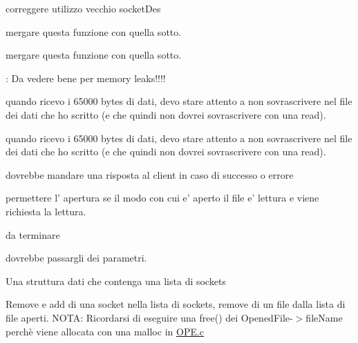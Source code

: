 
\begin{DoxyRefList}
\item[\label{todo__todo000007}%
\hypertarget{todo__todo000007}{}%
Globale \hyperlink{OPE_8c_af1f79690eec0a7727a519ba59a891762}{create\+Control\+Sock} (int port\+No, int socket\+Id)]correggere utilizzo vecchio socket\+Des  
\item[\label{todo__todo000003}%
\hypertarget{todo__todo000003}{}%
Globale \hyperlink{CommandsHandler_8h_a919c7f4b4bcb820f1d6566238178390e}{get\+Command\+I\+D} (char $\ast$)]mergare questa funzione con quella sotto.  
\item[\label{todo__todo000003}%
\hypertarget{todo__todo000003}{}%
Globale \hyperlink{CommandsHandler_8h_a919c7f4b4bcb820f1d6566238178390e}{get\+Command\+I\+D} (char $\ast$)]mergare questa funzione con quella sotto.  
\item[\label{todo__todo000006}%
\hypertarget{todo__todo000006}{}%
Globale \hyperlink{OPE_8c_a6eccb6ec6ec9c8375e70ab4088b511a5}{handle\+Open\+Command} (char $\ast$command, int socket)]\+: Da vedere bene per memory leaks!!!!  
\item[\label{todo__todo000002}%
\hypertarget{todo__todo000002}{}%
Globale \hyperlink{Client_2READ_8c_aa4b63039ca9686f5666ce6bbb33317d7}{mydfs\+\_\+read} (\hyperlink{structMyDFSId}{My\+D\+F\+S\+Id} $\ast$id, int pos, void $\ast$ptr, unsigned int size)]quando ricevo i 65000 bytes di dati, devo stare attento a non sovrascrivere nel file dei dati che ho scritto (e che quindi non dovrei sovrascrivere con una read).  
\item[\label{todo__todo000002}%
\hypertarget{todo__todo000002}{}%
Globale \hyperlink{Client_2READ_8c_aa4b63039ca9686f5666ce6bbb33317d7}{mydfs\+\_\+read} (\hyperlink{structMyDFSId}{My\+D\+F\+S\+Id} $\ast$id, int pos, void $\ast$ptr, unsigned int size)]quando ricevo i 65000 bytes di dati, devo stare attento a non sovrascrivere nel file dei dati che ho scritto (e che quindi non dovrei sovrascrivere con una read).  
\item[\label{todo__todo000005}%
\hypertarget{todo__todo000005}{}%
File \hyperlink{OPE_8c}{O\+P\+E.c} ]dovrebbe mandare una risposta al client in caso di successo o errore 

permettere l' apertura se il modo con cui e' aperto il file e' lettura e viene richiesta la lettura.  
\item[\label{todo__todo000001}%
\hypertarget{todo__todo000001}{}%
Globale \hyperlink{Cache_8h_a403785c0f2573dd16d81eff4ab26c20d}{read\+Request} (\hyperlink{structMyDFSId}{My\+D\+F\+S\+Id} $\ast$id, int pos, int size, \hyperlink{structCacheRequest}{Cache\+Request} $\ast$req)]da terminare  
\item[\label{todo__todo000008}%
\hypertarget{todo__todo000008}{}%
Globale \hyperlink{server_8c_a5e7b14672f9e2c9fa99b363004afb8e8}{spawn\+Thread} ()]dovrebbe passargli dei parametri.  
\item[\label{todo__todo000009}%
\hypertarget{todo__todo000009}{}%
File \hyperlink{StruttureDati_8c}{Strutture\+Dati.c} ]Una struttura dati che contenga una lista di sockets 

Remove e add di una socket nella lista di sockets, remove di un file dalla lista di file aperti. N\+O\+T\+A\+: Ricordarsi di eseguire una free() dei Opened\+File-\/$>$file\+Name perchè viene allocata con una malloc in \hyperlink{OPE_8c}{O\+P\+E.\+c}
\end{DoxyRefList}